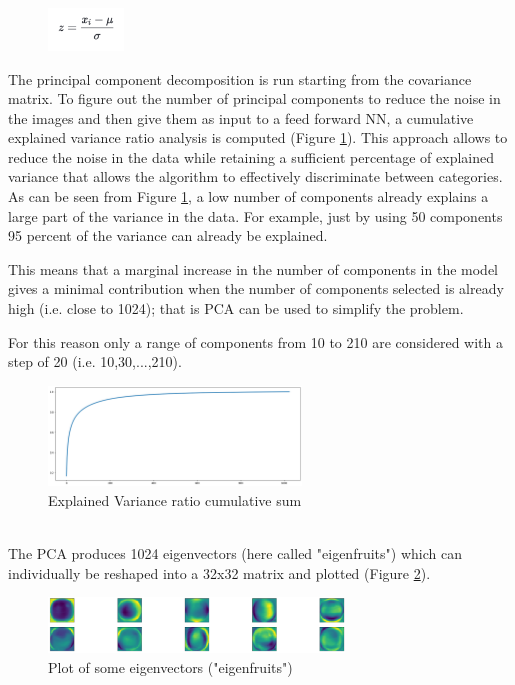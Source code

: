 \documentclass[10pt,english, openany]{book}
\begin{document}
\begin{figure}[H]

    \centering
    \includegraphics[width=0.18\textwidth]{Images/normalization.png}
\end{figure}

\newpage
The principal component decomposition is run starting from the covariance matrix. To figure out the number of principal components to reduce the noise in the images and then give them as input to a feed forward NN, a cumulative explained variance ratio analysis is computed (Figure \ref{fig:4.3}). This approach allows to reduce the noise in the data while retaining a sufficient percentage of explained variance that allows the algorithm to effectively discriminate between categories.
As can be seen from Figure \ref{fig:4.3}, a low number of components already explains a large part of the variance in the data.
For example, just by using 50 components 95 percent of the variance can already be explained.

This means that a marginal increase in the number of components in the model gives a minimal contribution when the number of components selected is already high (i.e. close to 1024); that is PCA can be used to simplify the problem.

For this reason only a range of components from 10 to 210 are considered with a step of 20 (i.e. 10,30,...,210). \\
\begin{figure}[H]
    \centering
    \includegraphics[width=0.6\textwidth]{Images/1.2. PCA explained_variance_ratio_cumsum.png}
    \caption{\label{fig:4.3}Explained Variance ratio cumulative sum}
\end{figure}
\noindent \\ The PCA produces 1024 eigenvectors (here called "eigenfruits") which can individually be reshaped into a 32x32 matrix and plotted (Figure \ref{fig:4.4}).\\

\begin{figure}[H]
    \centering
    \includegraphics[width=0.7\textwidth]{Images/1.3 Eigenfruits.png}
    \caption{\label{fig:4.4}Plot of some eigenvectors ("eigenfruits")}
\end{figure}
\end{document}
